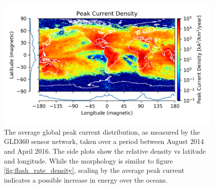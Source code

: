 \begin{figure}[h!]
\begin{center}
\includegraphics{figures/peak_current_density.png}
\end{center}
\caption[Average global peak current rate rate]{The average global peak current distribution, as measured by the GLD360 sensor network, taken over a period between August 2014 and April 2016. The side plots show the relative density vs latitude and longitude. While the morphology is similar to figure \ref{fig:flash_rate_density}, scaling by the average peak current indicates a possible increase in energy over the oceans.}
\label{fig:peak_current_density}
\end{figure}

